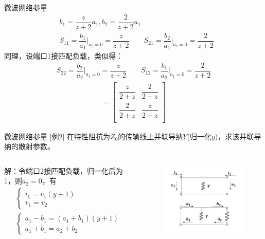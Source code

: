 \begin{frame}{微波网络参量}
    \begin{align*}
         & b_1=\dfrac{z}{z+2}a_1,b_2=\dfrac{2}{z+2}a_1                 \\
         & S_{11}=\dfrac{b_1}{a_1}\bigg|_{a_2=0}=\dfrac{z}{z+2} \qquad
        S_{21}=\dfrac{b_2}{a_1}\bigg|_{a_2=0}=\dfrac{2}{z+2}
    \end{align*}
    同理，设端口1接匹配负载，类似得：
    \begin{align*}
        S_{22}=\dfrac{b_2}{a_2}\bigg|_{a_1=0}=\dfrac{z}{z+2} \qquad S_{12}=\dfrac{b_1}{a_2}\bigg|_{a_1=0}=\dfrac{2}{z+2}
    \end{align*}
    \begin{gather*}
        [S]=
        \begin{bmatrix*}
            \dfrac{z}{2+z} & \dfrac{2}{2+z} \\
            \dfrac{2}{2+z} & \dfrac{z}{2+z} \\
        \end{bmatrix*}
    \end{gather*}
\end{frame}

\begin{frame}{微波网络参量}
    [例2] \quad 在特性阻抗为$Z_0$的传输线上并联导纳$Y$(归一化$y$)，求该并联导纳的散射参数。
    \begin{columns}
        \begin{column}{0.5\linewidth}
            解：令端口2接匹配负载，归一化后为1，则$a_2=0$，有
            \begin{gather*}
                \begin{cases}
                    i_1=v_1(y+1) \\
                    v_1=v_2
                \end{cases}
                \\
                \begin{cases}
                    a_1-b_1=(a_1+b_1)(y+1) \\
                    a_1+b_1=a_2+b_2
                \end{cases}
            \end{gather*}
        \end{column}
        \begin{column}{0.5\linewidth}
            \begin{figure}
                \includegraphics[width=6cm]{Cha5//fig5-15.pdf}
            \end{figure}
        \end{column}
    \end{columns}
\end{frame}

